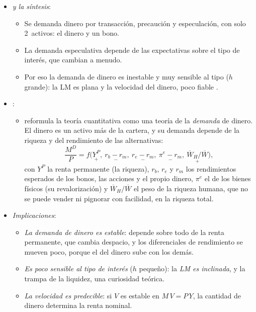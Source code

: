 \documentclass[11pt]{article}
\begin{document}
\begin{itemize}
\item \emph{ y la síntesis}:
  \begin{itemize}
  \item Se demanda dinero por transacción, precaución y especulación, con solo 2~activos: el dinero y un bono.
  \item La demanda especulativa depende de las expectativas sobre el tipo de interés, que cambian a menudo.
  \item Por eso la demanda de dinero es inestable y muy sensible al tipo ($h$ grande): la LM es plana y la velocidad del dinero, poco fiable .
  \end{itemize}
\item \emph{}:
  \begin{itemize}
  \item \textcite{Friedman1956Quantity} reformula la teoría cuantitativa como una teoría de la \emph{demanda} de dinero. El dinero es un activo más de la cartera, y su demanda depende de la riqueza y del rendimiento de las alternativas\nocite{Mishkin2013Economics}:
  \begin{equation}
  \frac{M^D}{P}=f\Big(\underset{+}{Y^P},\ \underset{-}{r_b-r_m},\ \underset{-}{r_e-r_m},\ \underset{-}{\pi^e-r_m},\ \underset{+}{\overline{W}_H/\overline{W}}\Big), \label{eq:demanda-dinero-friedman}
  \end{equation}
  con $Y^P$ la renta permanente (la riqueza), $r_b$, $r_e$ y $r_m$ los rendimientos esperados de los bonos, las acciones y el propio dinero, $\pi^e$ el de los bienes físicos (su revalorización) y $\overline{W}_H/\overline{W}$ el peso de la riqueza humana, que no se puede vender ni pignorar con facilidad, en la riqueza total.
  \end{itemize}
\item \emph{Implicaciones}:
  \begin{itemize}
  \item \emph{La demanda de dinero es estable}: depende sobre todo de la renta permanente, que cambia despacio, y los diferenciales de rendimiento se mueven poco, porque el del dinero sube con los demás.
  \item \emph{Es poco sensible al tipo de interés} ($h$ pequeño): la \emph{LM es inclinada}, y la trampa de la liquidez, una curiosidad teórica.
  \item \emph{La velocidad es predecible}: si $V$ es estable en $M\,V=P\,Y$, la cantidad de dinero determina la renta nominal.
  \end{itemize}
\end{itemize}
\end{document}

